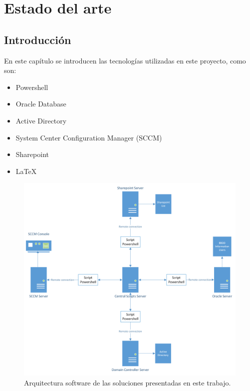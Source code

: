 \documentclass[a4paper, 12pt]{book}
\begin{document}
\cleardoublepage

\chapter{Estado del arte}
\label{chap:estado}

\section{Introducción}
\label{sec:Introducción}

En este capítulo se introducen las tecnologías utilizadas en este proyecto, como son:

\begin{itemize}
\item Powershell~\cite{lee2011windows}

\item Oracle Database~\cite{greenwald2013oracle}

\item Active Directory~\cite{desmond2008active}

\item System Center Configuration Manager (SCCM)~\cite{krstevski2014mastering}

\item Sharepoint~\cite{cawood2013microsoft}

\item \LaTeX~\cite{griffiths2016learning}
\end{itemize}

\begin{figure}
	\centering
	\includegraphics[width=17cm, keepaspectratio]{img/Diagrama_tecnologias.png}
	\caption{Arquitectura software de las soluciones presentadas en este trabajo.}
	\label{fig:Diagrama_tecnologias}
\end{figure}
\end{document}
